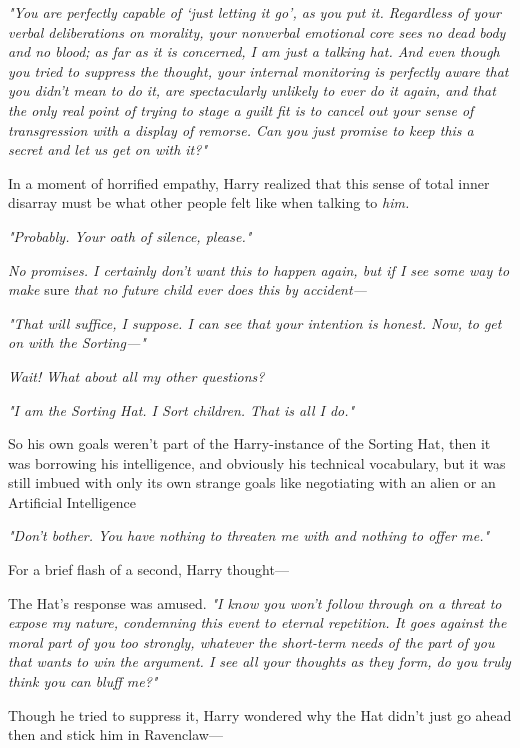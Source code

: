 \emph{"You are perfectly capable of `just letting it go', as you put it.
Regardless of your verbal deliberations on morality, your nonverbal emotional
core sees no dead body and no blood; as far as it is concerned, I am just a
talking hat. And even though you tried to suppress the thought, your internal
monitoring is perfectly aware that you didn't mean to do it, are spectacularly
unlikely to ever do it again, and that the only real point of trying to stage a
guilt fit is to cancel out your sense of transgression with a display of
remorse. Can you just promise to keep this a secret and let us get on with it?"}

In a moment of horrified empathy, Harry realized that this sense of total inner
disarray must be what other people felt like when talking to \emph{him.}

\emph{"Probably. Your oath of silence, please."}

\emph{No promises. I certainly don't want this to happen again, but if I see
some way to make} sure \emph{that no future child ever does this by accident---}

\emph{"That will suffice, I suppose. I can see that your intention is honest.
Now, to get on with the Sorting\mbox{---}"}

\emph{Wait! What about all my other questions?}

\emph{"I am the Sorting Hat. I Sort children. That is all I do."}

So his own goals weren't part of the Harry-instance of the Sorting Hat,
then{\el} it was borrowing his intelligence, and obviously his technical
vocabulary, but it was still imbued with only its own strange goals{\el}
like negotiating with an alien or an Artificial Intelligence{\el}

\emph{"Don't bother. You have nothing to threaten me with and nothing to offer
me."}

For a brief flash of a second, Harry thought\mbox{---}

The Hat's response was amused. \emph{"I know you won't follow through on a
threat to expose my nature, condemning this event to eternal repetition. It
goes against the moral part of you too strongly, whatever the short-term needs
of the part of you that wants to win the argument. I see all your thoughts as
they form, do you truly think you can bluff me?"}

Though he tried to suppress it, Harry wondered why the Hat didn't just go ahead
then and stick him in Ravenclaw\mbox{---}

